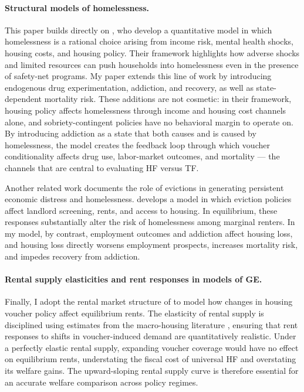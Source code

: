 \documentclass[parskip=full]{article}
\theoremstyle{plain}
\theoremstyle{definition}
\theoremstyle{remark}
\begin{document}
\paragraph{Structural models of homelessness.}
This paper builds directly on \citet{az-2024}, who develop a quantitative model in which homelessness is a rational choice arising from income risk, mental health shocks, housing costs, and housing policy. Their framework highlights how adverse shocks and limited resources can push households into homelessness even in the presence of safety-net programs. My paper extends this line of work by introducing endogenous drug experimentation, addiction, and recovery, as well as state-dependent mortality risk. These additions are not cosmetic: in their framework, housing policy affects homelessness through income and housing cost channels alone, and sobriety-contingent policies have no behavioral margin to operate on. By introducing addiction as a state that both causes and is caused by homelessness, the model creates the feedback loop through which voucher conditionality affects drug use, labor-market outcomes, and mortality — the channels that are central to evaluating HF versus TF.

Another related work documents the role of evictions in generating persistent economic distress and homelessness. \citet{abramson_eviction_policies_jf_forthcoming} develops a model in which eviction policies affect landlord screening, rents, and access to housing. In equilibrium, these responses substantially alter the risk of homelessness among marginal renters. In my model, by contrast, employment outcomes and addiction affect housing loss, and housing loss directly worsens employment prospects, increases mortality risk, and impedes recovery from addiction.

\paragraph{Rental supply elasticities and rent responses in models of GE.}
Finally, I adopt the rental market structure of \citet{garrigaeetal-2009} to model how changes in housing voucher policy affect equilibrium rents. The elasticity of rental supply is disciplined using estimates from the macro-housing literature \citep{rotberg_steinberg_2024_mortgage_interest_deductions}, ensuring that rent responses to shifts in voucher-induced demand are quantitatively realistic. Under a perfectly elastic rental supply, expanding voucher coverage would have no effect on equilibrium rents, understating the fiscal cost of universal HF and overstating its welfare gains. The upward-sloping rental supply curve is therefore essential for an accurate welfare comparison across policy regimes. 
\end{document}
